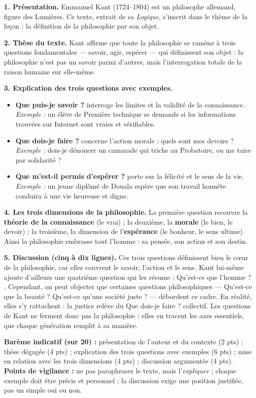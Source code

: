 \documentclass[11pt]{article}
\begin{document}
\begin{corrige}
\textbf{1. Présentation.} Emmanuel Kant (1724--1804) est un philosophe allemand, figure des Lumières. Ce texte, extrait de sa \emph{Logique}, s'inscrit dans le thème de la leçon : la définition de la philosophie par son objet.

\textbf{2. Thèse du texte.} Kant affirme que toute la philosophie se ramène à trois questions fondamentales — savoir, agir, espérer — qui définissent son objet : la philosophie n'est pas un savoir parmi d'autres, mais l'interrogation totale de la raison humaine sur elle-même.

\textbf{3. Explication des trois questions avec exemples.}
\begin{itemize}
\item \og \textbf{Que puis-je savoir ?} \fg{} interroge les limites et la validité de la connaissance. \emph{Exemple :} un élève de Première technique se demande si les informations trouvées sur Internet sont vraies et vérifiables.
\item \og \textbf{Que dois-je faire ?} \fg{} concerne l'action morale : quels sont mes devoirs ? \emph{Exemple :} dois-je dénoncer un camarade qui triche au Probatoire, ou me taire par solidarité ?
\item \og \textbf{Que m'est-il permis d'espérer ?} \fg{} porte sur la félicité et le sens de la vie. \emph{Exemple :} un jeune diplômé de Douala espère que son travail honnête conduira à une vie heureuse et digne.
\end{itemize}

\textbf{4. Les trois dimensions de la philosophie.} La première question recouvre la \textbf{théorie de la connaissance} (le vrai) ; la deuxième, la \textbf{morale} (le bien, le devoir) ; la troisième, la dimension de l'\textbf{espérance} (le bonheur, le sens ultime). Ainsi la philosophie embrasse tout l'homme : sa pensée, son action et son destin.

\textbf{5. Discussion (cinq à dix lignes).} Ces trois questions définissent bien le cœur de la philosophie, car elles couvrent le savoir, l'action et le sens. Kant lui-même ajoute d'ailleurs une quatrième question qui les résume : \og Qu'est-ce que l'homme ? \fg{}. Cependant, on peut objecter que certaines questions philosophiques — Qu'est-ce que la beauté ? Qu'est-ce qu'une société juste ? — débordent ce cadre. En réalité, elles s'y rattachent : la justice relève du \og Que dois-je faire ? \fg{} collectif. Les questions de Kant ne ferment donc pas la philosophie : elles en tracent les axes essentiels, que chaque génération remplit à sa manière.

\textbf{Barème indicatif (sur 20) :} présentation de l'auteur et du contexte (2 pts) ; thèse dégagée (4 pts) ; explication des trois questions avec exemples (6 pts) ; mise en relation avec les trois dimensions (4 pts) ; discussion argumentée (4 pts).
\textbf{Points de vigilance :} ne pas paraphraser le texte, mais l'\emph{expliquer} ; chaque exemple doit être précis et personnel ; la discussion exige une position justifiée, pas un simple oui ou non.
\end{corrige}
\end{document}
